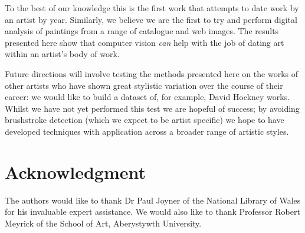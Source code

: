 \documentclass[conference,a4paper]{IEEEtran}
\begin{document}
To the best of our knowledge this is the first work that attempts to date work
by an artist by year. Similarly, we believe we are the first to try and perform
digital analysis of paintings from a range of catalogue and web images. The
results presented here show that computer vision \emph{can} help with the job
of dating art within an artist's body of work. 

Future directions will involve testing the methods presented here on the works
of other artists who have shown great stylistic variation over the course of
their career: we would like to build a dataset of, for example, David Hockney
works.  Whilst we have not yet performed this test we are hopeful of success;
by avoiding brushstroke detection (which we expect to be artist specific) we
hope to have developed techniques with application across a broader range of
artistic styles. 





\section*{Acknowledgment}


The authors would like to thank Dr Paul Joyner of the National Library of Wales
for his invaluable expert assistance. We would also like to thank Professor
Robert Meyrick of the School of Art, Aberystywth University.










\end{document}
